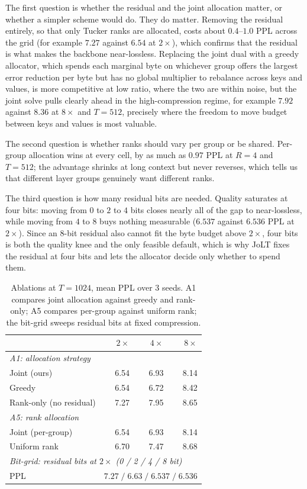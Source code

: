 \documentclass{article}
\begin{document}
The first question is whether the residual and the joint allocation matter, or whether a simpler scheme would do. They do matter. Removing the residual entirely, so that only Tucker ranks are allocated, costs about $0.4$--$1.0$ PPL across the grid (for example $7.27$ against $6.54$ at $2\times$), which confirms that the residual is what makes the backbone near-lossless. Replacing the joint dual with a greedy allocator, which spends each marginal byte on whichever group offers the largest error reduction per byte but has no global multiplier to rebalance across keys and values, is more competitive at low ratio, where the two are within noise, but the joint solve pulls clearly ahead in the high-compression regime, for example $7.92$ against $8.36$ at $8\times$ and $T{=}512$, precisely where the freedom to move budget between keys and values is most valuable.

The second question is whether ranks should vary per group or be shared. Per-group allocation wins at every cell, by as much as $0.97$ PPL at $R{=}4$ and $T{=}512$; the advantage shrinks at long context but never reverses, which tells us that different layer groups genuinely want different ranks.

The third question is how many residual bits are needed. Quality saturates at four bits: moving from $0$ to $2$ to $4$ bits closes nearly all of the gap to near-lossless, while moving from $4$ to $8$ buys nothing measurable ($6.537$ against $6.536$ PPL at $2\times$). Since an 8-bit residual also cannot fit the byte budget above $2\times$, four bits is both the quality knee and the only feasible default, which is why JoLT fixes the residual at four bits and lets the allocator decide only whether to spend them.

\begin{table}[t]
  \centering
  \caption{Ablations at $T{=}1024$, mean PPL over 3 seeds. A1 compares joint allocation against greedy and rank-only; A5 compares per-group against uniform rank; the bit-grid sweeps residual bits at fixed compression.}
  \label{tab:ablation}
  \begin{tabular}{lrrr}
    \toprule
    & $2\times$ & $4\times$ & $8\times$ \\
    \midrule
    \multicolumn{4}{l}{\emph{A1: allocation strategy}} \\
    \quad Joint (ours) & 6.54 & 6.93 & 8.14 \\
    \quad Greedy & 6.54 & 6.72 & 8.42 \\
    \quad Rank-only (no residual) & 7.27 & 7.95 & 8.65 \\
    \midrule
    \multicolumn{4}{l}{\emph{A5: rank allocation}} \\
    \quad Joint (per-group) & 6.54 & 6.93 & 8.14 \\
    \quad Uniform rank & 6.70 & 7.47 & 8.68 \\
    \midrule
    \multicolumn{4}{l}{\emph{Bit-grid: residual bits at $2\times$ (0 / 2 / 4 / 8 bit)}} \\
    \quad PPL & \multicolumn{3}{l}{$7.27 \;/\; 6.63 \;/\; 6.537 \;/\; 6.536$} \\
    \bottomrule
  \end{tabular}
\end{table}
\end{document}
